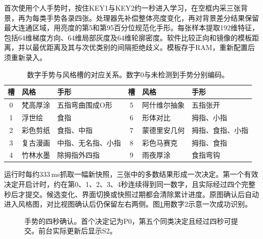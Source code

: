 首次使用个人手势时，按住KEY1与KEY2约一秒进入学习，在空框内采三张背景，再为每类手势各录四张。处理器先补偿整体亮度变化，再对背景差分结果保留最大连通区域，用亮度的第5和第95百分位规范化手形。每张样本提取192维特征，包括64维梯度方向、64维局部灰度及64维轮廓密度。软件比较正向和镜像的模板距离，并以最优距离及其与次优类别的间隔拒绝歧义。模板存于RAM，重新配置后须重新录入。

\begin{table}[H]\centering\small
\caption{数字手势与风格槽的对应关系。数字0与未检测到手势分别编码。}
\begin{tabularx}{\linewidth}{@{}clXclX@{}}\toprule
槽 & 风格 & 手形 & 槽 & 风格 & 手形\\\midrule
0 & 梵高厚涂 & 五指弯曲围成O形 & 5 & 阿什维尔抽象 & 五指张开\\
1 & 浮世绘 & 食指 & 6 & 形体对比 & 拇指、小指\\
2 & 彩色剪纸 & 食指、中指 & 7 & 蒙德里安几何 & 拇指、食指、小指\\
3 & 复古漫画 & 中指、无名指、小指 & 8 & 彩色马赛克 & 拇指、食指\\
4 & 竹林水墨 & 除拇指外四指 & 9 & 雨夜厚涂 & 食指弯钩\\\bottomrule
\end{tabularx}\end{table}

运行时每约333\,ms抓取一幅新快照，三张中的多数结果形成一次决定。第一个有效决定开启计时，约在第0、1、2、3、4秒连续得到同一数字，且实际经过四个完整秒后才提交。候选变化、界面切换或快照过期都会清除累计进度。原图确认后自动进入风格图，对比视图确认后仍保留左右两侧。图\ref{fig:gesture-time}用数字2示意一次成功识别。
\begin{figure}[H]\centering
{}
\caption{手势的四秒确认。首个决定记为P0，第五个同类决定且经过四秒可提交。前台实际更新后显示S2。}\label{fig:gesture-time}
\end{figure}
